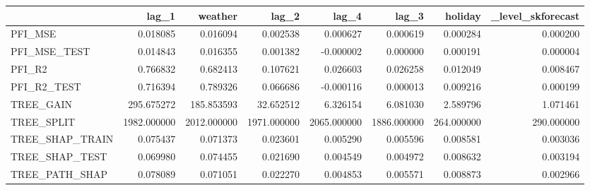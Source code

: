 \begin{tabular}{lrrrrrrr}
\toprule
 & lag_1 & weather & lag_2 & lag_4 & lag_3 & holiday & _level_skforecast \\
\midrule
PFI_MSE & 0.018085 & 0.016094 & 0.002538 & 0.000627 & 0.000619 & 0.000284 & 0.000200 \\
PFI_MSE_TEST & 0.014843 & 0.016355 & 0.001382 & -0.000002 & 0.000000 & 0.000191 & 0.000004 \\
PFI_R2 & 0.766832 & 0.682413 & 0.107621 & 0.026603 & 0.026258 & 0.012049 & 0.008467 \\
PFI_R2_TEST & 0.716394 & 0.789326 & 0.066686 & -0.000116 & 0.000013 & 0.009216 & 0.000199 \\
TREE_GAIN & 295.675272 & 185.853593 & 32.652512 & 6.326154 & 6.081030 & 2.589796 & 1.071461 \\
TREE_SPLIT & 1982.000000 & 2012.000000 & 1971.000000 & 2065.000000 & 1886.000000 & 264.000000 & 290.000000 \\
TREE_SHAP_TRAIN & 0.075437 & 0.071373 & 0.023601 & 0.005290 & 0.005596 & 0.008581 & 0.003036 \\
TREE_SHAP_TEST & 0.069980 & 0.074455 & 0.021690 & 0.004549 & 0.004972 & 0.008632 & 0.003194 \\
TREE_PATH_SHAP & 0.078089 & 0.071051 & 0.022270 & 0.004853 & 0.005571 & 0.008873 & 0.002966 \\
\bottomrule
\end{tabular}
